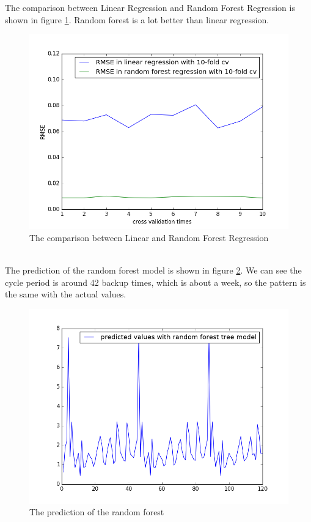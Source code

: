 \documentclass{article}
\begin{document}
The comparison between Linear Regression and Random Forest Regression is shown in figure \ref{fig:comp}. Random forest is a lot better than linear regression.\\
\begin{figure}[htbp]
\centering
\includegraphics[width=.6\textwidth]{compare.png}
\caption{The comparison between Linear and Random Forest Regression}
\label{fig:comp}
\end{figure}
\\
The prediction of the random forest model is shown in figure \ref{fig:r_pred}. We can see the cycle period is around 42 backup times, which is about a week, so the pattern is the same with the actual values.
\begin{figure}[htbp]
\centering
\includegraphics[width=.6\textwidth]{random_pred.png}
\caption{The prediction of the random forest}
\label{fig:r_pred}
\end{figure}
\end{document}
